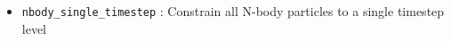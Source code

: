 \documentclass[a4paper]{article}
\newcommand{\var}[1]{\texttt{#1}}
\begin{document}
\begin{itemize}
\item \var{nbody\_single\_timestep} : Constrain all N-body particles to a single timestep level 





\end{itemize}












\end{document}
